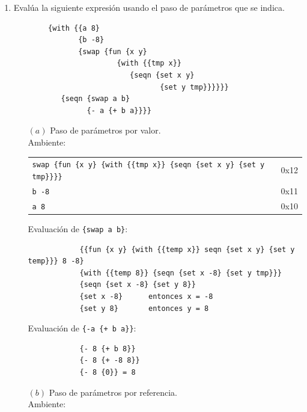 \documentclass[letterpaper,11pt]{article}
\begin{document}
\begin{enumerate}
    \item Evalúa la siguiente expresión usando el paso de parámetros que se indica.
    \begin{verbatim}
        {with {{a 8}
               {b -8}
               {swap {fun {x y}
                        {with {{tmp x}}
                           {seqn {set x y}
                                  {set y tmp}}}}}}
           {seqn {swap a b}
                 {- a {+ b a}}}}
    \end{verbatim}
    \begin{itemize}
        \item [$(a)$] Paso de parámetros por valor.\\
        Ambiente:
        \begin{center}
            \begin{tabular}{|l| c }
            \cline{1-1}
                \texttt{swap \hspace{1cm} \{fun \{x y\}
                        \{with \{\{tmp x\}\}
                           \{seqn \{set x y\}
                                  \{set y tmp\}\}\}\}} & 0x12\\\cline{1-1}
                \texttt{b \hspace{1.58cm} -8} & 0x11\\\cline{1-1}
                \texttt{a \hspace{1.6cm} 8} & 0x10\\\cline{1-1}
            \end{tabular}
        \end{center}
        Evaluación de \texttt{\{swap a b\}}:        \begin{verbatim}
            {{fun {x y} {with {{temp x}} seqn {set x y} {set y temp}}} 8 -8}
            {with {{temp 8}} {seqn {set x -8} {set y tmp}}}
            {seqn {set x -8} {set y 8}}
            {set x -8}      entonces x = -8
            {set y 8}       entonces y = 8
        \end{verbatim}
        Evaluación de \texttt{\{-a \{+ b a\}\}}:
        \begin{verbatim}
            {- 8 {+ b 8}}
            {- 8 {+ -8 8}}
            {- 8 {0}} = 8
        \end{verbatim}
        \item [$(b)$] Paso de parámetros por referencia.\\
        Ambiente:
        \begin{center}
            \begin{tabular}{|l| c }

\end{tabular}
\end{center}
\end{itemize}
\end{enumerate}
\end{document}
